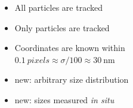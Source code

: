 \begin{frame}
\begin{columns}
	\\
	\footnotesize{\citet{Crocker1996}}	
	
	\bigskip
	
	\begin{itemize}
		\item All particles are tracked
		\item Only particles are tracked
		\item Coordinates are known within\\
			$\SI{0.1}{pixels} \approx \sigma/100 \approx \SI{30}{\nano\metre}$
		\item \alert{new}: arbitrary size distribution
		\item \alert{new}: sizes measured \emph{in situ}
	\end{itemize}
	\end{columns}
\end{frame}


